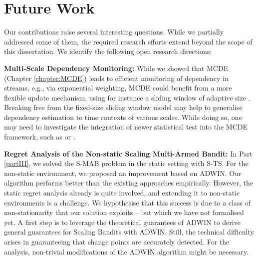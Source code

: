 \chapter{Future Work}
\glsresetall
\label{chapter:futurework}

Our contributions raise several interesting questions. While we partially addressed some of them, the required research efforts extend beyond the scope of this dissertation. We identify the following open research directions: 

\textbf{Multi-Scale Dependency Monitoring:} While we showed that \gls{MCDE} (Chapter \ref{chapter:MCDE}) leads to efficient monitoring of dependency in streams, e.g., via exponential weighting, \gls{MCDE} could benefit from a more flexible update mechanism, using for instance a sliding window of adaptive size \cite{DBLP:conf/sdm/BifetG07}. Breaking free from the fixed-size sliding window model may help to generalise dependency estimation to time contexts of various scales. While doing so, one may need to investigate the integration of newer statistical test into the \gls{MCDE} framework, such as \cite{fligner1981robust} or \cite{brunner2000nonparametric}.  

\textbf{Regret Analysis of the Non-static Scaling Multi-Armed Bandit:} In Part \ref{partIII}, we solved the \gls{S-MAB} problem in the static setting with \gls{S-TS}. For the non-static environment, we proposed an improvement based on \gls{ADWIN}. Our algorithm performs better than the existing approaches empirically. However, the static regret analysis already is quite involved, and extending it to non-static environments is a challenge. We hypothesise that this success is due to a class of non-stationarity that our solution exploits -- but which we have not formalised yet. A first step is to leverage the theoretical guarantees of \gls{ADWIN} to derive general guarantees for Scaling Bandits with \gls{ADWIN}. Still, the technical difficulty arises in guaranteeing that change points are accurately detected. For the analysis, non-trivial modifications of the \gls{ADWIN} algorithm might be necessary. 

